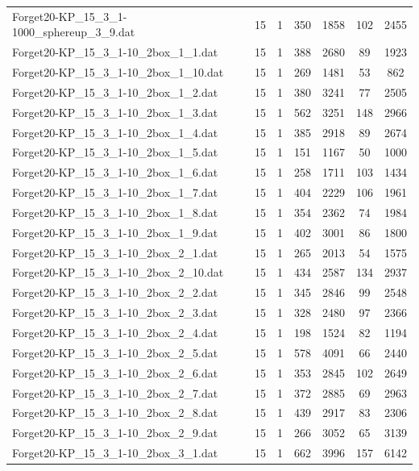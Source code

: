 \begin{table}[!ht]
\begin{tabular}{lcccccc}
Forget20-KP\_15\_3\_1-1000\_sphereup\_3\_9.dat & 15 & 1 & 350 & 1858 & 102 & 2455 \\
Forget20-KP\_15\_3\_1-10\_2box\_1\_1.dat & 15 & 1 & 388 & 2680 & 89 & 1923 \\
Forget20-KP\_15\_3\_1-10\_2box\_1\_10.dat & 15 & 1 & 269 & 1481 & 53 & 862 \\
Forget20-KP\_15\_3\_1-10\_2box\_1\_2.dat & 15 & 1 & 380 & 3241 & 77 & 2505 \\
Forget20-KP\_15\_3\_1-10\_2box\_1\_3.dat & 15 & 1 & 562 & 3251 & 148 & 2966 \\
Forget20-KP\_15\_3\_1-10\_2box\_1\_4.dat & 15 & 1 & 385 & 2918 & 89 & 2674 \\
Forget20-KP\_15\_3\_1-10\_2box\_1\_5.dat & 15 & 1 & 151 & 1167 & 50 & 1000 \\
Forget20-KP\_15\_3\_1-10\_2box\_1\_6.dat & 15 & 1 & 258 & 1711 & 103 & 1434 \\
Forget20-KP\_15\_3\_1-10\_2box\_1\_7.dat & 15 & 1 & 404 & 2229 & 106 & 1961 \\
Forget20-KP\_15\_3\_1-10\_2box\_1\_8.dat & 15 & 1 & 354 & 2362 & 74 & 1984 \\
Forget20-KP\_15\_3\_1-10\_2box\_1\_9.dat & 15 & 1 & 402 & 3001 & 86 & 1800 \\
Forget20-KP\_15\_3\_1-10\_2box\_2\_1.dat & 15 & 1 & 265 & 2013 & 54 & 1575 \\
Forget20-KP\_15\_3\_1-10\_2box\_2\_10.dat & 15 & 1 & 434 & 2587 & 134 & 2937 \\
Forget20-KP\_15\_3\_1-10\_2box\_2\_2.dat & 15 & 1 & 345 & 2846 & 99 & 2548 \\
Forget20-KP\_15\_3\_1-10\_2box\_2\_3.dat & 15 & 1 & 328 & 2480 & 97 & 2366 \\
Forget20-KP\_15\_3\_1-10\_2box\_2\_4.dat & 15 & 1 & 198 & 1524 & 82 & 1194 \\
Forget20-KP\_15\_3\_1-10\_2box\_2\_5.dat & 15 & 1 & 578 & 4091 & 66 & 2440 \\
Forget20-KP\_15\_3\_1-10\_2box\_2\_6.dat & 15 & 1 & 353 & 2845 & 102 & 2649 \\
Forget20-KP\_15\_3\_1-10\_2box\_2\_7.dat & 15 & 1 & 372 & 2885 & 69 & 2963 \\
Forget20-KP\_15\_3\_1-10\_2box\_2\_8.dat & 15 & 1 & 439 & 2917 & 83 & 2306 \\
Forget20-KP\_15\_3\_1-10\_2box\_2\_9.dat & 15 & 1 & 266 & 3052 & 65 & 3139 \\
Forget20-KP\_15\_3\_1-10\_2box\_3\_1.dat & 15 & 1 & 662 & 3996 & 157 & 6142 \\

\end{tabular}
\end{table}

